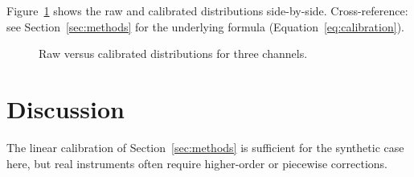 \documentclass[11pt]{article}
\begin{document}
Figure~\ref{fig:calibration} shows the raw and calibrated distributions
side-by-side. Cross-reference: see Section~\ref{sec:methods} for the
underlying formula (Equation~\ref{eq:calibration}).

\begin{figure}[h]
    \centering
    \caption{Raw versus calibrated distributions for three channels.}
    \label{fig:calibration}
\end{figure}

\section{Discussion}
\label{sec:discussion}

The linear calibration of Section~\ref{sec:methods} is sufficient for the
synthetic case here, but real instruments often require higher-order or
piecewise corrections.



\end{document}
